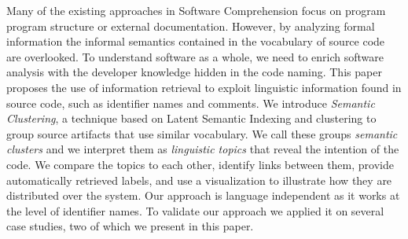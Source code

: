 %
%
%
%
%

Many of the existing approaches in Software Comprehension focus on program program structure or external documentation. However, by analyzing formal information the informal semantics contained in the vocabulary of source code are overlooked. To understand software as a whole, we need to enrich software analysis with the developer knowledge hidden in the code naming. This paper proposes the use of information retrieval to exploit linguistic information found in source code, such as identifier names and comments. We introduce \emph{Semantic Clustering}, a technique based on Latent Semantic Indexing and clustering to group source artifacts that use similar vocabulary. We call these groups \emph{semantic clusters} and we interpret them as \emph{linguistic topics} that reveal the intention of the code. We compare the topics to each other, identify links between them, provide automatically retrieved labels, and use a visualization to illustrate how they are distributed over the system. Our approach is language independent as it works at the level of identifier names. To validate our approach we applied it on several case studies, two of which we present in this paper.


